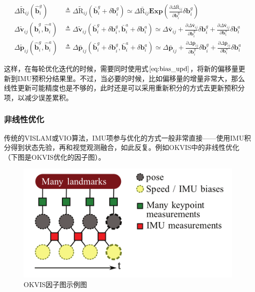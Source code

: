 \begin{equation}
\begin{aligned}
    \Delta\tilde{\mathrm R}_{ij}(\hat{\mathbf b}_i^g)
  &\triangleq \Delta\tilde{\mathrm R}_{ij}(\bar{\mathbf b}^g_i + \delta\mathbf{b}^g_i)
  \simeq \Delta\bar{\mathrm R}_{ij}
  \bm{Exp}\left(
      \tfrac{\partial\Delta\bar{\mathrm R}_{ij}}{\partial\mathbf{b}^g_i}
      \delta\mathbf{b}^g_i
  \right) \\
  \Delta\tilde{\mathbf v}_{ij}(\hat{\mathbf b}^g_i,\hat{\mathbf b}^a_i)
  &\triangleq \Delta\tilde{\mathbf v}_{ij}(
  \bar{\mathbf b}^g_i + \delta\mathbf{b}^g_i,
  \bar{\mathbf b}^a_i + \delta\mathbf{b}^a_i)
  \simeq \Delta\bar{\mathbf v}_{ij} +
  \tfrac{\partial\Delta\bar{\mathbf v}_{ij}}{\partial\mathbf{b}^g_i}
  \delta\mathbf{b}^g_i +
  \tfrac{\partial\Delta\bar{\mathbf v}_{ij}}{\partial\mathbf{b}^a_i}
  \delta\mathbf{b}^a_i \\
  \Delta\tilde{\mathbf p}_{ij}(\hat{\mathbf b}^g_i,\hat{\mathbf b}^a_i)
  &\triangleq \Delta\bar{\mathbf p}_{ij}(
  \bar{\mathbf b}^g_i + \delta\mathbf{b}^g_i,
  \bar{\mathbf b}^a_i + \delta\mathbf{b}^a_i)
  \simeq \Delta\bar{\mathbf p}_{ij} +
  \tfrac{\partial\Delta\bar{\mathbf p}_{ij}}{\partial\mathbf{b}^g_i}
  \delta\mathbf{b}^g_i +
  \tfrac{\partial\Delta\bar{\mathbf p}_{ij}}{\partial\mathbf{b}^a_i}
  \delta\mathbf{b}^a_i
\end{aligned}\label{eq:bias_upd}
\end{equation}

这样，在每轮优化迭代的时候，需要同时使用式$\eqref{eq:bias_upd}$，将新的偏移量更新到IMU预积分结果里。不过，当必要的时候，比如偏移量的增量非常大，那么线性更新可能精度也是不够的，此时还是可以采用重新积分的方式去更新预积分项，以减少误差累积。

\subsubsection*{非线性优化}

传统的VISLAM或VIO算法，IMU项参与优化的方式一般非常直接——使用IMU积分得到状态先验，再和视觉观测融合，如此反复。例如OKVIS中的非线性优化（下图是OKVIS优化的因子图）。

\begin{figure}[htb!]
    \centering
    \includegraphics[width=.5\textwidth]{./figs/okvis.png}
    \caption{OKVIS因子图示例图\citep{leutenegger2015keyframe}}
    \label{fig:okvis}
\end{figure}

